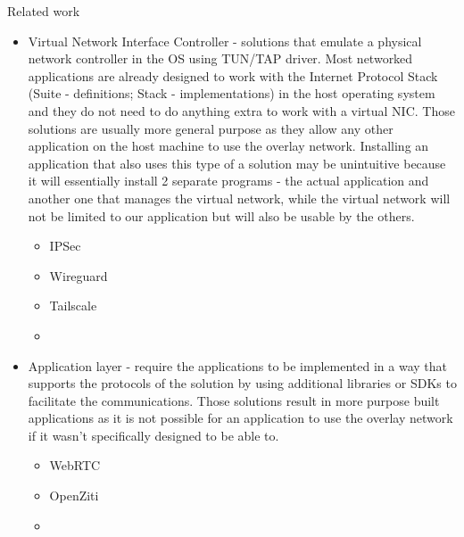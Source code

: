 \begin{frame}{Related work}
\begin{itemize}
\begin{itemize}
    \begin{itemize}
    \tightlist
    \item
      Virtual Network Interface Controller - solutions that emulate a
      physical network controller in the OS using TUN/TAP driver. Most
      networked applications are already designed to work with the
      Internet Protocol Stack (Suite - definitions; Stack -
      implementations) in the host operating system and they do not need
      to do anything extra to work with a virtual NIC. Those solutions
      are usually more general purpose as they allow any other
      application on the host machine to use the overlay network.
      Installing an application that also uses this type of a solution
      may be unintuitive because it will essentially install 2 separate
      programs - the actual application and another one that manages the
      virtual network, while the virtual network will not be limited to
      our application but will also be usable by the others.

      \begin{itemize}
      \tightlist
      \item
        IPSec
      \item
        Wireguard
      \item
        Tailscale
      \item
      \end{itemize}
    \item
      Application layer - require the applications to be implemented in
      a way that supports the protocols of the solution by using
      additional libraries or SDKs to facilitate the communications.
      Those solutions result in more purpose built applications as it is
      not possible for an application to use the overlay network if it
      wasn't specifically designed to be able to.

      \begin{itemize}
      \tightlist
      \item
        WebRTC
      \item
        OpenZiti
      \item
      \end{itemize}
    \end{itemize}
  \end{itemize}
\end{itemize}
\end{frame}

